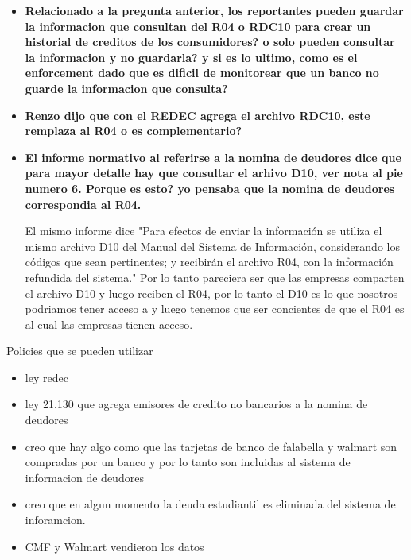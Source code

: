 \documentclass[12pt]{article}
\theoremstyle{plain}
\theoremstyle{plain}
\theoremstyle{definition}  %
\theoremstyle{remark}  %
\begin{document}
\begin{itemize}
    \item \textbf{Relacionado a la pregunta anterior, los reportantes pueden guardar la informacion que consultan del R04 o RDC10 para crear un historial de creditos de los consumidores? o solo pueden consultar la informacion y no guardarla? y si es lo ultimo, como es el enforcement dado que es dificil de monitorear que un banco no guarde la informacion que consulta?}
    
    \item \textbf{Renzo dijo que con el REDEC agrega el archivo RDC10, este remplaza al R04 o es complementario?}
    
    \item \textbf{El informe normativo \textcite{cmf_informe_2021} al referirse a la nomina de deudores dice que para mayor detalle hay que consultar el arhivo D10, ver nota al pie numero 6. Porque es esto? yo pensaba que la nomina de deudores correspondia al R04.  }
    
    El mismo informe dice "Para efectos de enviar la información se utiliza el mismo archivo D10 del Manual del Sistema de Información, considerando los códigos que sean pertinentes; y recibirán el archivo R04, con la información refundida del sistema." Por lo tanto pareciera ser que las empresas comparten el archivo D10 y luego reciben el R04, por lo tanto el D10 es lo que nosotros podriamos tener acceso a y luego tenemos que ser concientes de que el R04 es al cual las empresas tienen acceso. 

\end{itemize}

\vspace{2cm}


Policies que se pueden utilizar 
\begin{itemize}
    \item ley redec
    \item ley 21.130 que agrega emisores de credito no bancarios a la nomina de deudores
    \item creo que hay algo como que las tarjetas de banco de falabella y walmart son compradas por un banco y por lo tanto son incluidas al sistema de informacion de deudores
    \item creo que en algun momento la deuda estudiantil es eliminada del sistema de inforamcion. 
    \item CMF y Walmart vendieron los datos 
\end{itemize}
\end{document}
